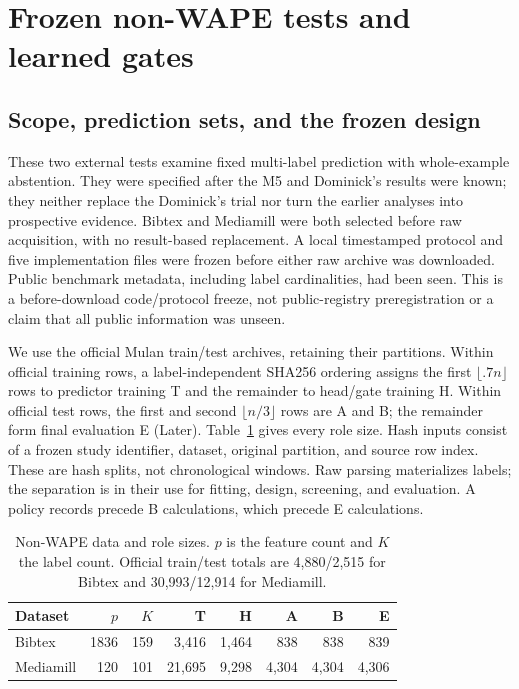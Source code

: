\section{Frozen non-WAPE tests and learned gates}
\label{app:v13-nonwape}

\subsection{Scope, prediction sets, and the frozen design}
\label{sec:v13-design}
These two external tests examine fixed multi-label prediction with whole-example abstention. They were specified after the M5 and Dominick's results were known; they neither replace the Dominick's trial nor turn the earlier analyses into prospective evidence. Bibtex and Mediamill were both selected before raw acquisition, with no result-based replacement. A local timestamped protocol and five implementation files were frozen before either raw archive was downloaded. Public benchmark metadata, including label cardinalities, had been seen. This is a before-download code/protocol freeze, not public-registry preregistration or a claim that all public information was unseen.

We use the official Mulan train/test archives, retaining their partitions. Within official training rows, a label-independent SHA256 ordering assigns the first $\lfloor .7n\rfloor$ rows to predictor training T and the remainder to head/gate training H. Within official test rows, the first and second $\lfloor n/3\rfloor$ rows are A and B; the remainder form final evaluation E (Later). Table~\ref{tab:v13-roles} gives every role size. Hash inputs consist of a frozen study identifier, dataset, original partition, and source row index. These are hash splits, not chronological windows. Raw parsing materializes labels; the separation is in their use for fitting, design, screening, and evaluation. A policy records precede B calculations, which precede E calculations.

\begin{table}[H]\centering\small
\caption{Non-WAPE data and role sizes. $p$ is the feature count and $K$ the label count. Official train/test totals are 4,880/2,515 for Bibtex and 30,993/12,914 for Mediamill.}
\label{tab:v13-roles}
\begin{tabular}{lrrrrrrr}\toprule
Dataset & $p$ & $K$ & T & H & A & B & E\\\midrule
Bibtex & 1836 & 159 & 3,416 & 1,464 & 838 & 838 & 839 \\
Mediamill & 120 & 101 & 21,695 & 9,298 & 4,304 & 4,304 & 4,306 \\
\bottomrule\end{tabular}
\end{table}

